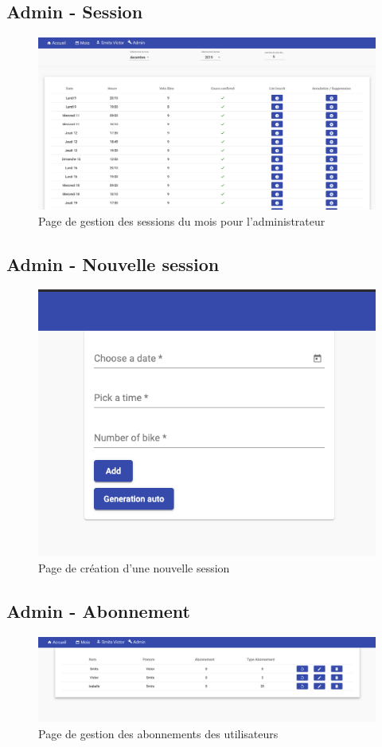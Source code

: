 	\vspace{\baselineskip}	
	\subsection{Admin - Session}
		\begin{figure}[h!]
       	 	\includegraphics[width=0.8\linewidth, center]{Mockup/Admin-Session.png}
       	 	\caption{Page de gestion des sessions du mois pour l'administrateur}
       	\end{figure}
       	
	\newpage
	\subsection{Admin - Nouvelle session}
		\begin{figure}[h!]
       	 	\includegraphics[width=0.8\linewidth, center]{Mockup/Admin-Nouvelle-Session.png}
       	 	\caption{Page de création d'une nouvelle session}
       	\end{figure}
       	
	\vspace{\baselineskip}
	\subsection{Admin - Abonnement}
		\begin{figure}[h!]
       	 	\includegraphics[width=0.8\linewidth, center]{Mockup/Admin-Abonnement.png}
       	 	\caption{Page de gestion des abonnements des utilisateurs}
       	\end{figure}
       	
